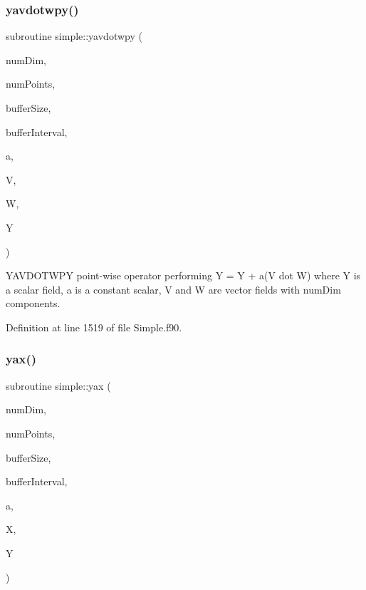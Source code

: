 \subsubsection{\texorpdfstring{yavdotwpy()}{yavdotwpy()}}
{\footnotesize\ttfamily subroutine simple\+::yavdotwpy (\begin{DoxyParamCaption}\item[{integer(kind=4), intent(in)}]{num\+Dim,  }\item[{integer(kind=8), intent(in)}]{num\+Points,  }\item[{integer(kind=8), dimension(numdim), intent(in)}]{buffer\+Size,  }\item[{integer(kind=8), dimension(2$\ast$numdim), intent(in)}]{buffer\+Interval,  }\item[{real(kind=8), intent(in)}]{a,  }\item[{real(kind=8), dimension(numdim$\ast$numpoints), intent(in)}]{V,  }\item[{real(kind=8), dimension(numdim$\ast$numpoints), intent(in)}]{W,  }\item[{real(kind=8), dimension(numpoints), intent(inout)}]{Y }\end{DoxyParamCaption})}



Y\+A\+V\+D\+O\+T\+W\+PY point-\/wise operator performing Y = Y + a(\+V dot W) where Y is a scalar field, a is a constant scalar, V and W are vector fields with num\+Dim components. 



Definition at line 1519 of file Simple.\+f90.

\hypertarget{namespacesimple_aeb1042bc53e651d671973267ebe04281}{}\label{namespacesimple_aeb1042bc53e651d671973267ebe04281} 
\subsubsection{\texorpdfstring{yax()}{yax()}}
{\footnotesize\ttfamily subroutine simple\+::yax (\begin{DoxyParamCaption}\item[{integer(kind=4), intent(in)}]{num\+Dim,  }\item[{integer(kind=8), intent(in)}]{num\+Points,  }\item[{integer(kind=8), dimension(numdim), intent(in)}]{buffer\+Size,  }\item[{integer(kind=8), dimension(2$\ast$numdim), intent(in)}]{buffer\+Interval,  }\item[{real(kind=8), intent(in)}]{a,  }\item[{real(kind=8), dimension(numpoints), intent(in)}]{X,  }\item[{real(kind=8), dimension(numpoints), intent(out)}]{Y }\end{DoxyParamCaption})}



